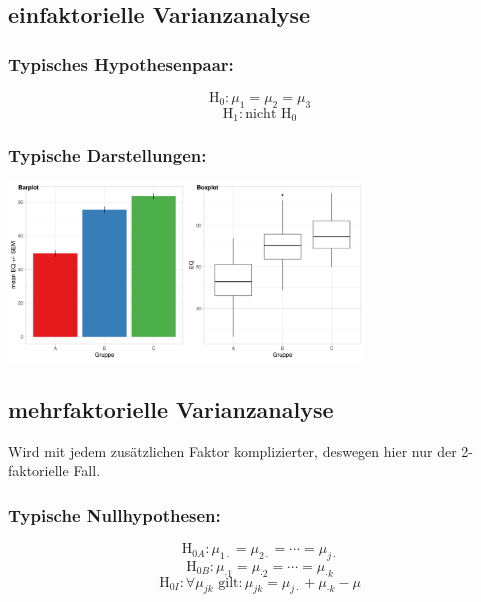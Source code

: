 \documentclass[
]{book}
\begin{document}
\hypertarget{einfaktorielle-varianzanalyse}{%
\subsection{einfaktorielle Varianzanalyse}\label{einfaktorielle-varianzanalyse}}

\hypertarget{typisches-hypothesenpaar-1}{%
\subsubsection{Typisches Hypothesenpaar:}\label{typisches-hypothesenpaar-1}}

\[\text{H}_0: \mu_{\text{1}} = \mu_{\text{2}} = \mu_{\text{3}}\]
\[\text{H}_1:\text{nicht } \text{H}_0\]

\hypertarget{typische-darstellungen-1}{%
\subsubsection{Typische Darstellungen:}\label{typische-darstellungen-1}}

\begin{center}\includegraphics[width=266.666666666667pt]{imgs/efVA} \end{center}

\hypertarget{mehrfaktorielle-varianzanalyse}{%
\subsection{mehrfaktorielle Varianzanalyse}\label{mehrfaktorielle-varianzanalyse}}

Wird mit jedem zusätzlichen Faktor komplizierter, deswegen hier nur der 2-faktorielle Fall.

\hypertarget{typische-nullhypothesen}{%
\subsubsection{Typische Nullhypothesen:}\label{typische-nullhypothesen}}

\[\text{H}_{0A}:  \mu_{1\cdot}  =  \mu_{2\cdot}  =  \cdots   =  \mu_{j\cdot}\]
\[\text{H}_{0B}:  \mu_{\cdot 1}  =  \mu_{\cdot 2}  =  \cdots   =  \mu_{\cdot k}\]
\[\text{H}_{0I}:  \forall {\mu}_{jk} \text{ gilt}: {\mu}_{jk}  =  {\mu}_{j\cdot} + {\mu}_{\cdot k} - \mu\]
\end{document}
